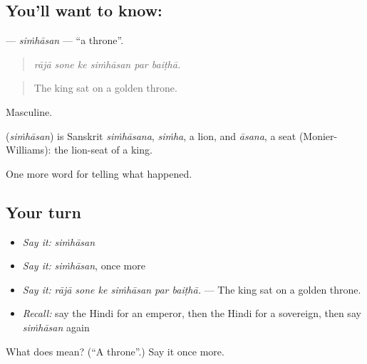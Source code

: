\subsection*{You'll want to know: }
\textbf{} — \emph{siṁhāsan} — \textquotedblleft{}a throne\textquotedblright{}.

\begin{quote}
     
\end{quote}

\begin{quote}
\emph{rājā sone ke siṁhāsan par baiṭhā.}
\end{quote}

\begin{quote}
The king sat on a golden throne.
\end{quote}

Masculine.

\begin{cousinweb}
\textbf{} (\emph{siṁhāsan}) is Sanskrit \emph{siṁhāsana}, \emph{siṁha}, a lion, and \emph{āsana}, a seat (Monier-Williams): the lion-seat of a king.
\end{cousinweb}

\begin{grammarlens}[title={What you've built}]
One more word for telling what happened.
\end{grammarlens}

\subsection*{Your turn}
\begin{itemize}
\raggedright
  \item \emph{Say it:} \emph{siṁhāsan}
  \item \emph{Say it:} \emph{siṁhāsan}, once more
  \item \emph{Say it:} \emph{rājā sone ke siṁhāsan par baiṭhā.} — The king sat on a golden throne.
  \item \emph{Recall:} say the Hindi for an emperor, then the Hindi for a sovereign, then say \emph{siṁhāsan} again
\end{itemize}

\begin{tcolorbox}[breakable,colback=teal!4,colframe=teal!35!black,title={Before you move on}]
What does  mean? (\textquotedblleft{}A throne\textquotedblright{}.) Say it once more.
\end{tcolorbox}
